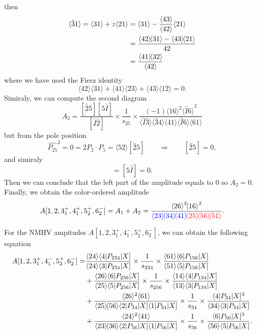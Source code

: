 \documentclass[12pt]{article}
\numberwithin{equation}{section}
\newcommand{\mdavg}[2]{\langle #1 \rangle\!\langle #2 \rangle}
\newcommand{\avg}[1]{\langle #1 \rangle}
\newcommand{\asqu}[1]{{\langle#1\rangle}^2}
\newcommand{\cbrak}[2]{\avg{#1}\![#2]}
\newcommand{\asbra}[3]{\langle #1 | #2 |#3 ]}
\begin{document}
then
\begin{align}
    \avg{\hat{3}1}=\avg{31}+z\avg{21}&=\avg{31}-\frac{\avg{43}}{\avg{42}}\avg{21}\notag\\
    &=\frac{\mdavg{42}{31}-\mdavg{43}{21}}{42}\notag\\
    &=\frac{\mdavg{41}{32}}{\avg{42}}
\end{align}
where we have used the Fierz identity
\begin{equation}
    \mdavg{42}{31}+\mdavg{41}{23}+\mdavg{43}{12}=0.
\end{equation}
Simiraly, we can compute the second diagram
\begin{equation}
    A_2=\frac{[\hat{2}5][5\hat{I}]}{[\hat{I}\hat{2}]}\times\frac{1}{s_{25}}\times \frac{(-1)\asqu{16}\asqu{\hat{I}6}}{\mdavg{\hat{I}\hat{3}}{\hat{3}4}
    \!\mdavg{41}{\hat{I}6}\!\avg{61}}
\end{equation}
but from the pole position
\begin{equation}
    \hat{P_{25}}^2=0=2P_2\cdot P_5=\cbrak{52}{\hat{2}5}\qquad\Rightarrow \qquad [\hat{2}5]=0,
\end{equation}
and simiraly
\begin{equation}
    [\hat{2}\hat{I}]=[5\hat{I}]=0.
\end{equation}
Then we can conclude that the left part of the amplitude equals to 0 so $A_2=0$. Finally, we obtain the color-ordered amplitude 
\begin{equation}
    A[1,2,3_1^+,4_1^+,5_2^+,6_2^-]=A_1+A_2=\frac{\asqu{26}\!\asqu{16}}{\textcolor{blue}{\mdavg{23}{34}\!\avg{41}}\!\textcolor{red}{\mdavg{25}{56}\!\avg{51}}}.
\end{equation}

For the NMHV ampitudes $A[1,2,3_1^+,4_1^-,5_2^+,6_2^-]$, we can obtain the following equation
\begin{align}
    A[1,2,3_1^+,4_1^-,5_2^+,6_2^-] =& \frac{\avg{24}\asbra{4}{P_{234}}{X}}{\avg{24}\asbra{3}{P_{234}}{X}}\times\frac{1}{s_{234}}\times\frac{\avg{61}\asbra{6}{P_{156}}{X}}{\avg{51}\asbra{5}{P_{156}}{X}}\notag\\
    &+\frac{\avg{26}\asbra{6}{P_{256}}{X}}{\avg{25}\asbra{5}{P_{256}}{X}}\times\frac{1}{s_{256}}\times\frac{\avg{14}\asbra{4}{P_{134}}{X}}{\avg{13}\asbra{3}{P_{134}}{X}}\notag\\
    &+\frac{\avg{26}^2\avg{61}}{\mdavg{25}{56}\asbra{2}{P_{34}}{X}\asbra{1}{P_{34}}{X}}\times\frac{1}{s_{34}}\times\frac{\asbra{4}{P_{34}}{X}^3}{\avg{34}\asbra{3}{P_{34}}{X}}\notag\\
    &+\frac{\avg{24}^2\avg{41}}{\mdavg{23}{36}\asbra{2}{P_{56}}{X}\asbra{1}{P_{56}}{X}}\times\frac{1}{s_{56}}\times\frac{\asbra{6}{P_{56}}{X}^3}{\avg{56}\asbra{5}{P_{56}}{X}}.
\end{align}
\end{document}
